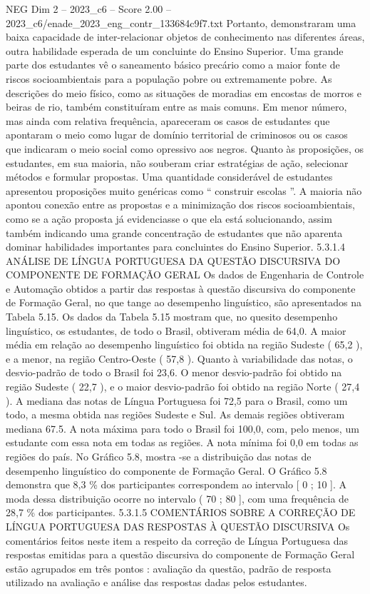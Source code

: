 \begin{textsample}{NEG Dim 2 – 2023\_c6 – Score 2.00 – 2023\_c6/enade\_2023\_eng\_contr\_133684c9f7.txt}
Portanto, demonstraram uma baixa capacidade de inter-relacionar objetos de conhecimento nas diferentes áreas, outra habilidade esperada de um concluinte do Ensino Superior.
Uma grande parte dos estudantes vê o saneamento básico precário como a maior fonte de riscos socioambientais para a população pobre ou extremamente pobre.
As descrições do meio físico, como as situações de moradias em encostas de morros e beiras de rio, também constituíram entre as mais comuns.
Em menor número, mas ainda com relativa frequência, apareceram os casos de estudantes que apontaram o meio como lugar de domínio territorial de criminosos ou os casos que indicaram o meio social como opressivo aos negros.
Quanto às proposições, os estudantes, em sua maioria, não souberam criar estratégias de ação, selecionar métodos e formular propostas.
Uma quantidade considerável de estudantes apresentou proposições muito genéricas como “ construir escolas ”.
A maioria não apontou conexão entre as propostas e a minimização dos riscos socioambientais, como se a ação proposta já evidenciasse o que ela está solucionando, assim também indicando uma grande concentração de estudantes que não aparenta dominar habilidades importantes para concluintes do Ensino Superior. 5.3.1.4 ANÁLISE DE LÍNGUA PORTUGUESA DA QUESTÃO DISCURSIVA DO COMPONENTE DE FORMAÇÃO GERAL Os dados de Engenharia de Controle e Automação obtidos a partir das respostas à questão discursiva do componente de Formação Geral, no que tange ao desempenho linguístico, são apresentados na Tabela 5.15.
Os dados da Tabela 5.15 mostram que, no quesito desempenho linguístico, os estudantes, de todo o Brasil, obtiveram média de 64,0.
A maior média em relação ao desempenho linguístico foi obtida na região Sudeste ( 65,2 ), e a menor, na região Centro-Oeste ( 57,8 ).
Quanto à variabilidade das notas, o desvio-padrão de todo o Brasil foi 23,6.
O menor desvio-padrão foi obtido na região Sudeste ( 22,7 ), e o maior desvio-padrão foi obtido na região Norte ( 27,4 ).
A mediana das notas de Língua Portuguesa foi 72,5 para o Brasil, como um todo, a mesma obtida nas regiões Sudeste e Sul.
As demais regiões obtiveram mediana 67.5.
A nota máxima para todo o Brasil foi 100,0, com, pelo menos, um estudante com essa nota em todas as regiões.
A nota mínima foi 0,0 em todas as regiões do país.
No Gráfico 5.8, mostra -se a distribuição das notas de desempenho linguístico do componente de Formação Geral.
O Gráfico 5.8 demonstra que 8,3 \% dos participantes correspondem ao intervalo [ 0 ; 10 ].
A moda dessa distribuição ocorre no intervalo ( 70 ; 80 ], com uma frequência de 28,7 \% dos participantes. 5.3.1.5 COMENTÁRIOS SOBRE A CORREÇÃO DE LÍNGUA PORTUGUESA DAS RESPOSTAS À QUESTÃO DISCURSIVA Os comentários feitos neste item a respeito da correção de Língua Portuguesa das respostas emitidas para a questão discursiva do componente de Formação Geral estão agrupados em três pontos : avaliação da questão, padrão de resposta utilizado na avaliação e análise das respostas dadas pelos estudantes.

\end{textsample}
